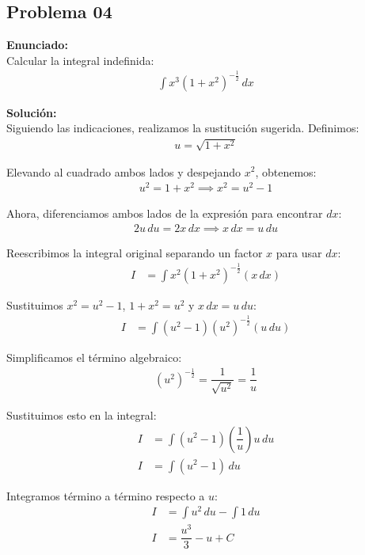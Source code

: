 \subsection*{Problema 04}

\textbf{Enunciado:} \\
Calcular la integral indefinida:
\begin{align*}
\int x^3 (1 + x^2)^{-\frac{1}{2}} \, dx
\end{align*}

\textbf{Solución:} \\
Siguiendo las indicaciones, realizamos
la sustitución sugerida. Definimos:
\begin{align*}
u = \sqrt{1 + x^2}
\end{align*}

Elevando al cuadrado ambos lados y
despejando $x^2$, obtenemos:
\begin{align*}
u^2 = 1 + x^2 \implies x^2 = u^2 - 1
\end{align*}

Ahora, diferenciamos ambos lados de la
expresión para encontrar $dx$:
\begin{align*}
2u \, du = 2x \, dx \implies x \, dx = u \, du
\end{align*}

Reescribimos la integral original
separando un factor $x$ para usar $dx$:
\begin{align*}
I &= \int x^2 (1 + x^2)^{-\frac{1}{2}} (x \, dx)
\end{align*}

Sustituimos $x^2 = u^2 - 1$,
$1 + x^2 = u^2$ y $x \, dx = u \, du$:
\begin{align*}
I &= \int (u^2 - 1) (u^2)^{-\frac{1}{2}} (u \, du)
\end{align*}

Simplificamos el término algebraico:
\begin{align*}
(u^2)^{-\frac{1}{2}} = \dfrac{1}{\sqrt{u^2}} = \dfrac{1}{u}
\end{align*}

Sustituimos esto en la integral:
\begin{align*}
I &= \int (u^2 - 1) \left(\dfrac{1}{u}\right) u \, du \\
I &= \int (u^2 - 1) \, du
\end{align*}

Integramos término a término respecto a $u$:
\begin{align*}
I &= \int u^2 \, du - \int 1 \, du \\
I &= \dfrac{u^3}{3} - u + C
\end{align*}

